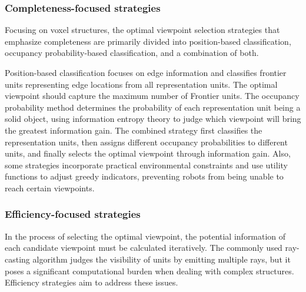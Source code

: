 \subsubsection{Completeness-focused strategies}
Focusing on voxel structures, the optimal viewpoint selection strategies that emphasize completeness are primarily divided into position-based classification\cite{song2020online, zhou2021fuel, batinovic2021multi, batinovic2022shadowcasting,deng2020frontier}, occupancy probability-based classification\cite{potthast2014probabilistic}, and a combination of both\cite{pan2021global}.

Position-based classification focuses on edge information and classifies frontier units representing edge locations from all representation units. The optimal viewpoint should capture the maximum number of Frontier units. 
The occupancy probability method determines the probability of each representation unit being a solid object, using information entropy theory to judge which viewpoint will bring the greatest information gain. 
The combined strategy first classifies the representation units, then assigns different occupancy probabilities to different units, and finally selects the optimal viewpoint through information gain.
Also, some strategies incorporate practical environmental constraints and use utility functions to adjust greedy indicators, preventing robots from being unable to reach certain viewpoints\cite{vasquez2014view}.

\subsubsection{Efficiency-focused strategies}
In the process of selecting the optimal viewpoint, the potential information of each candidate viewpoint must be calculated iteratively. 
The commonly used ray-casting algorithm judges the visibility of units by emitting multiple rays, but it poses a significant computational burden when dealing with complex structures. 
Efficiency strategies aim to address these issues.

